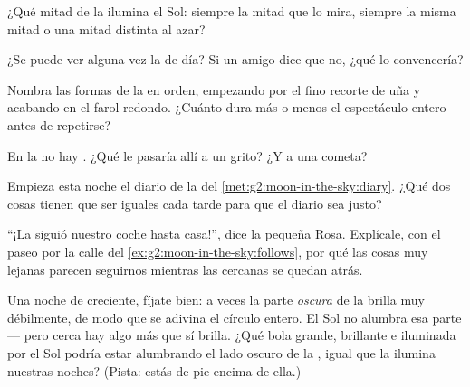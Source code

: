 \begin{exercise}[$\star$]\label{exo:g2:moon-in-the-sky:4}
¿Qué mitad de la  ilumina el Sol: siempre la mitad que lo
mira, siempre la misma mitad o una mitad distinta al azar?
\end{exercise}

\begin{exercise}[$\star$]\label{exo:g2:moon-in-the-sky:5}
¿Se puede ver alguna vez la  de día? Si un amigo dice que no,
¿qué lo convencería?
\end{exercise}

\begin{exercise}[$\star$]\label{exo:g2:moon-in-the-sky:6}
Nombra las formas de la  en orden, empezando por el fino recorte
de uña y acabando en el farol redondo. ¿Cuánto dura más o menos el
espectáculo entero antes de repetirse?
\end{exercise}

\begin{exercise}[$\star$]\label{exo:g2:moon-in-the-sky:7}
En la  no hay . ¿Qué le pasaría allí a un grito? ¿Y a una
cometa?
\end{exercise}

\begin{exercise}[$\star$]\label{exo:g2:moon-in-the-sky:8}
Empieza esta noche el diario de la  del
\cref{met:g2:moon-in-the-sky:diary}. ¿Qué dos cosas tienen que ser
iguales cada tarde para que el diario sea justo?
\end{exercise}

\begin{exercise}[$\star\star$]\label{exo:g2:moon-in-the-sky:9}
``¡La  siguió nuestro coche hasta casa!'', dice la pequeña Rosa.
Explícale, con el paseo por la calle del
\cref{ex:g2:moon-in-the-sky:follows}, por qué las cosas muy lejanas
parecen seguirnos mientras las cercanas se quedan atrás.
\end{exercise}

\begin{exercise}[$\star\star$]\label{exo:g2:moon-in-the-sky:10}
Una noche de creciente, fíjate bien: a veces la parte \emph{oscura}
de la  brilla muy débilmente, de modo que se adivina el círculo
entero. El Sol no alumbra esa parte --- pero cerca hay algo más que sí
brilla. ¿Qué bola grande, brillante e iluminada por el Sol podría
estar alumbrando el lado oscuro de la , igual que la 
ilumina nuestras noches? (Pista: estás de pie encima de ella.)
\end{exercise}
